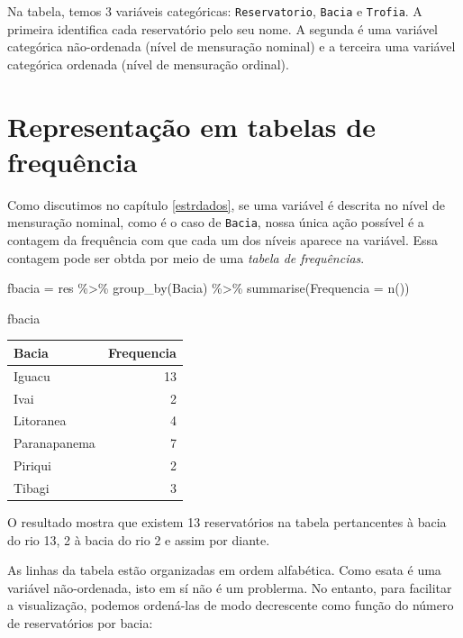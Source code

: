 \documentclass[
]{book}
\newenvironment{Shaded}{\begin{snugshade}}{\end{snugshade}}
\newcommand{\AttributeTok}[1]{\textcolor[rgb]{0.77,0.63,0.00}{#1}}
\newcommand{\FunctionTok}[1]{\textcolor[rgb]{0.00,0.00,0.00}{#1}}
\newcommand{\NormalTok}[1]{#1}
\newcommand{\OtherTok}[1]{\textcolor[rgb]{0.56,0.35,0.01}{#1}}
\newcommand{\SpecialCharTok}[1]{\textcolor[rgb]{0.00,0.00,0.00}{#1}}
\begin{document}
Na tabela, temos 3 variáveis categóricas: \texttt{Reservatorio}, \texttt{Bacia} e \texttt{Trofia}. A primeira identifica cada reservatório pelo seu nome. A segunda é uma variável categórica não-ordenada (nível de mensuração nominal) e a terceira uma variável categórica ordenada (nível de mensuração ordinal).

\hypertarget{representauxe7uxe3o-em-tabelas-de-frequuxeancia}{%
\section{Representação em tabelas de frequência}\label{representauxe7uxe3o-em-tabelas-de-frequuxeancia}}

Como discutimos no capítulo \ref{estrdados}, se uma variável é descrita no nível de mensuração nominal, como é o caso de \texttt{Bacia}, nossa única ação possível é a contagem da frequência com que cada um dos níveis aparece na variável. Essa contagem pode ser obtda por meio de uma \emph{tabela de frequências}.

\begin{Shaded}
\begin{Highlighting}[]
\NormalTok{fbacia }\OtherTok{=}\NormalTok{ res }\SpecialCharTok{\%\textgreater{}\%} 
  \FunctionTok{group\_by}\NormalTok{(Bacia) }\SpecialCharTok{\%\textgreater{}\%} 
  \FunctionTok{summarise}\NormalTok{(}\AttributeTok{Frequencia =} \FunctionTok{n}\NormalTok{())}

\NormalTok{fbacia}
\end{Highlighting}
\end{Shaded}

\begin{tabular}{l|r}
\hline
Bacia & Frequencia\\
\hline
Iguacu & 13\\
\hline
Ivai & 2\\
\hline
Litoranea & 4\\
\hline
Paranapanema & 7\\
\hline
Piriqui & 2\\
\hline
Tibagi & 3\\
\hline
\end{tabular}

O resultado mostra que existem 13 reservatórios na tabela pertancentes à bacia do rio 13, 2 à bacia do rio 2 e assim por diante.

As linhas da tabela estão organizadas em ordem alfabética. Como esata é uma variável não-ordenada, isto em sí não é um problerma. No entanto, para facilitar a visualização, podemos ordená-las de modo decrescente como função do número de reservatórios por bacia:
\end{document}
